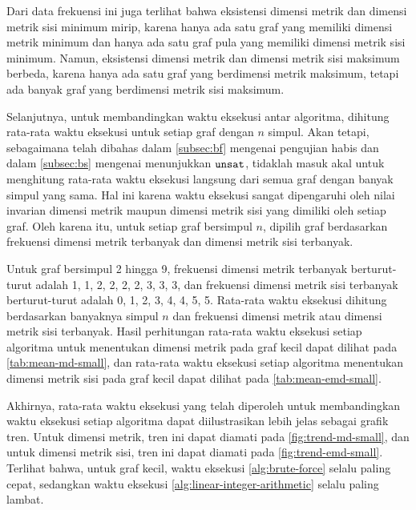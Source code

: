 Dari data frekuensi ini juga terlihat bahwa eksistensi dimensi metrik dan dimensi metrik sisi minimum mirip, karena hanya ada satu graf yang memiliki dimensi metrik minimum dan hanya ada satu graf pula yang memiliki dimensi metrik sisi minimum. Namun, eksistensi dimensi metrik dan dimensi metrik sisi maksimum berbeda, karena hanya ada satu graf yang berdimensi metrik maksimum, tetapi ada banyak graf yang berdimensi metrik sisi maksimum.

Selanjutnya, untuk membandingkan waktu eksekusi antar algoritma, dihitung rata-rata waktu eksekusi untuk setiap graf dengan \(n\) simpul. Akan tetapi, sebagaimana telah dibahas dalam \autoref{subsec:bf} mengenai pengujian habis dan dalam \autoref{subsec:bs} mengenai menunjukkan \(\mathtt{unsat}\), tidaklah masuk akal untuk menghitung rata-rata waktu eksekusi langsung dari semua graf dengan banyak simpul yang sama. Hal ini karena waktu eksekusi sangat dipengaruhi oleh nilai invarian dimensi metrik maupun dimensi metrik sisi yang dimiliki oleh setiap graf. Oleh karena itu, untuk setiap graf bersimpul \(n\), dipilih graf berdasarkan frekuensi dimensi metrik terbanyak dan dimensi metrik sisi terbanyak.

Untuk graf bersimpul 2 hingga 9, frekuensi dimensi metrik terbanyak berturut-turut adalah 1, 1, 2, 2, 2, 2, 3, 3, 3, dan frekuensi dimensi metrik sisi terbanyak berturut-turut adalah 0, 1, 2, 3, 4, 4, 5, 5.  Rata-rata waktu eksekusi dihitung berdasarkan banyaknya simpul \(n\) dan frekuensi dimensi metrik atau dimensi metrik sisi terbanyak. Hasil perhitungan rata-rata waktu eksekusi setiap algoritma untuk menentukan dimensi metrik pada graf kecil dapat dilihat pada \autoref{tab:mean-md-small}, dan rata-rata waktu eksekusi setiap algoritma menentukan dimensi metrik sisi pada graf kecil dapat dilihat pada \autoref{tab:mean-emd-small}.

Akhirnya, rata-rata waktu eksekusi yang telah diperoleh untuk membandingkan waktu eksekusi setiap algoritma dapat diilustrasikan lebih jelas sebagai grafik tren. Untuk dimensi metrik, tren ini dapat diamati pada \autoref{fig:trend-md-small}, dan untuk dimensi metrik sisi, tren ini dapat diamati pada \autoref{fig:trend-emd-small}. Terlihat bahwa, untuk graf kecil, waktu eksekusi \autoref{alg:brute-force} selalu paling cepat, sedangkan waktu eksekusi \autoref{alg:linear-integer-arithmetic} selalu paling lambat.

\begin{landscape}
\begin{center}
	\renewcommand{\minipagewidth}{0.475\linewidth}

	\vphantom{}
	\vfill

	
	\hspace{2em}
	

	\vspace{2em}

	
	\hspace{2em}
	

	\vfill \vfill \vfill
\end{center}
\end{landscape}


